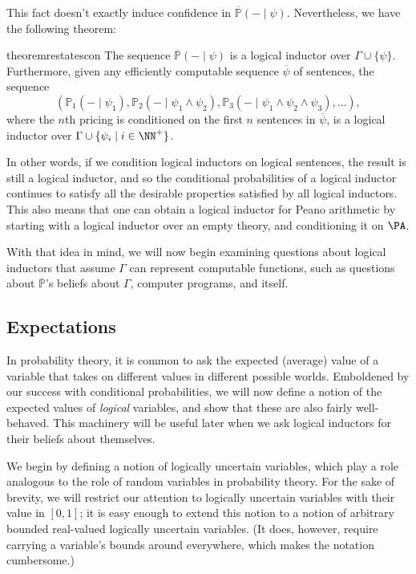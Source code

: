\documentclass[authordate,onecolumn,noenvironments]{miri-tech-article}
\numberwithin{equation}{subsection}
\newcommand{\seq}[1]{{\overline{#1}}}
\newcommand{\any}{-}
\newcommand{\nn}{n}
\newcommand{\representscomputations}{can represent computable functions}
\newcommand{\rparenthetical}[1]{\hfill\upshape{{\small (#1)}}} %
\newcommand{\proofin}[1]{\rparenthetical{Proof in:~#1.}}
\newcommand{\BelState}{\mathbb{P}}
\newcommand{\pt}{\BelState}
\newcommand{\MP}{\seq{\pt}}
\newcommand{\Theory}{\Gamma}
\begin{document}
This fact doesn't exactly induce confidence in ${\MP(\any\mid\psi)}$. Nevertheless, we have the following theorem:
\begin{restatable}{theorem}{restatescon}\label{thm:scon}
  The sequence $\MP(\any\mid\psi)$ is a logical inductor over $\Theory \cup \{\psi\}$. Furthermore, given any efficiently computable sequence $\seq{\psi}$ of sentences, the sequence
  \[
    \left(\pt_1(\any \mid \psi_1), \pt_2(\any \mid \psi_1 \land \psi_2), \pt_3(\any \mid \psi_1 \land \psi_2 \land \psi_3), \ldots\right),
  \]
  where the $\nn$th pricing is conditioned on the first $\nn$ sentences in $\seq{\psi}$, is a logical inductor over $\Theory \cup \{\psi_i \mid i \in \NN^+\}$.
  \proofin{\ref{app:scon}}
\end{restatable}

In other words, if we condition logical inductors on logical sentences, the result is still a logical inductor, and so the conditional probabilities of a logical inductor continues to satisfy all the desirable properties satisfied by all logical inductors. This also means that one can obtain a logical inductor for Peano arithmetic by starting with a logical inductor over an empty theory, and conditioning it on $\PA$.

With that idea in mind, we will now begin examining questions about logical inductors that assume $\Theory$ \representscomputations, such as questions about $\MP$'s beliefs about $\Theory$, computer programs, and itself.


\subsection{Expectations}\label{sec:expectations}

In probability theory, it is common to ask the expected (average) value of a variable that takes on different values in different possible worlds. Emboldened by our success with conditional probabilities, we will now define a notion of the expected values of \emph{logical} variables, and show that these are also fairly well-behaved. This machinery will be useful later when we ask logical inductors for their beliefs about themselves.

We begin by defining a notion of logically uncertain variables, which play a role analogous to the role of random variables in probability theory. For the sake of brevity, we will restrict our attention to logically uncertain variables with their value in $[0, 1]$; it is easy enough to extend this notion to a notion of arbitrary bounded real-valued logically uncertain variables. (It does, however, require carrying a variable's bounds around everywhere, which makes the notation cumbersome.)
\end{document}
